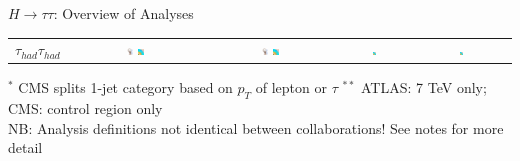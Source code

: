 \documentclass{beamer}
\begin{document}
\begin{frame}{$H \rightarrow \tau \tau$: Overview of Analyses}
\begin{table}
\begin{tabular}{c | c | c | c | c | c | c}
			
			\hline
			$\tau_{had} \tau_{had}$ &
			\includegraphics[width=0.05\textwidth]{figures/atlas_logo.pdf} \includegraphics[width=0.05\textwidth]{figures/cms_logo.pdf} &
			\includegraphics[width=0.05\textwidth]{figures/atlas_logo.pdf} \includegraphics[width=0.05\textwidth]{figures/cms_logo.pdf} &	
			\includegraphics[width=0.05\textwidth]{figures/cms_logo.pdf}&
			&\includegraphics[width=0.05\textwidth]{figures/cms_logo.pdf} 
			&  
			\\					
				
		\end{tabular}
	\end{table}
	\scriptsize
	\textcolor{BrickRed}{$^{*}$ CMS splits 1-jet category based on $p_T$ of lepton or $\tau$} \newline
	\textcolor{BrickRed}{$^{**}$ ATLAS: 7 TeV only; CMS: control region only} \\
	NB: Analysis definitions not identical between collaborations!  See notes for more detail
\end{frame}
\end{document}
